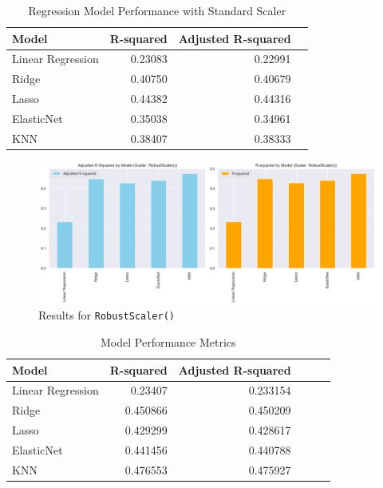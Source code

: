 \documentclass{article}
\theoremstyle{mytheoremstyle}
\theoremstyle{mytheoremstyle}
\theoremstyle{myproblemstyle}
\begin{document}
\begin{table}[ht]
\centering
\caption{Regression Model Performance with Standard Scaler}
\begin{tabular}{@{}lrrr@{}}
\toprule
Model & \multicolumn{1}{c}{R-squared} & \multicolumn{1}{c}{Adjusted R-squared} \\ 
\midrule
Linear Regression & 0.23083 & 0.22991 \\
Ridge & 0.40750 & 0.40679 \\
Lasso & 0.44382 & 0.44316 \\
ElasticNet & 0.35038 & 0.34961 \\
KNN & 0.38407 & 0.38333 \\
\bottomrule
\end{tabular}
\label{tab:model_performance_standard_scaler}
\end{table}

\FloatBarrier %
\pagebreak

\begin{figure}[htbp]
\centering
\includegraphics[width=\linewidth]{Images/evalRegModelRobustScaler.png}
\caption{Results for \texttt{RobustScaler()}}
\label{fig:Robust Scaler Results}
\end{figure}


\begin{table}[ht]
\centering
\caption{Model Performance Metrics}
\begin{tabular}{@{}lrrrrr@{}}
\toprule
Model             & \multicolumn{1}{c}{R-squared} & \multicolumn{1}{c}{Adjusted R-squared} \\ 
\midrule
Linear Regression  & 0.23407 & 0.233154 \\
Ridge              & 0.450866 & 0.450209 \\
Lasso              & 0.429299 & 0.428617 \\
ElasticNet         & 0.441456 & 0.440788 \\
KNN                & 0.476553 & 0.475927 \\
\bottomrule
\end{tabular}
\label{tab:model_performance_extended}
\end{table}
\end{document}
